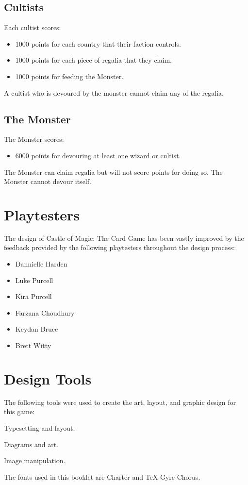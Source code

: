\documentclass[10pt, parskip=half-, twoside]{scrartcl}
\begin{document}
\newpage

\subsection*{Cultists}
Each cultist scores:
\begin{itemize}[itemindent=*, leftmargin=*]
\item 1000 points for each country that their faction controls.
\item 1000 points for each piece of regalia that they claim.
\item 1000 points for feeding the Monster.
\end{itemize}
A cultist who is devoured by the monster cannot claim any of the regalia.

\subsection*{The Monster}
The Monster scores:
\begin{itemize}[itemindent=*, leftmargin=*]
\item 6000 points for devouring at least one wizard or cultist.
\end{itemize}
The Monster can claim regalia but will not score points for doing so. The Monster cannot devour itself.

\newpage

\section*{Playtesters}
The design of Castle of Magic: The Card Game has been vastly improved by the feedback provided by the following playtesters throughout the design process:
\begin{multicols}{2}
\begin{itemize}%
\item Dannielle Harden
\item Luke Purcell
\item Kira Purcell
\item Farzana Choudhury
\item Keydan Bruce
\item Brett Witty
\end{itemize}
\end{multicols}

\section*{Design Tools}
The following tools were used to create the art, layout, and graphic design for this game:
\begin{description}[font=\normalfont\textbullet\space, nosep]
	\item[LuaLaTeX:] Typesetting and layout.
	\item[TikZ:] Diagrams and art.
	\item[GIMP:] Image manipulation.
\end{description}
\vspace{1ex}
The fonts used in this booklet are Charter and TeX Gyre Chorus.
\end{document}

